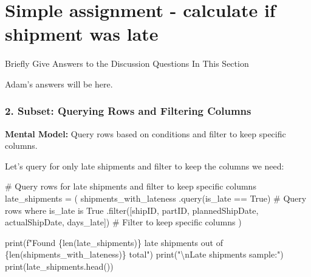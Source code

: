 \documentclass[
  letterpaper,
  DIV=11,
  numbers=noendperiod]{scrartcl}
\makeatletter
\let\oldparagraph\paragraph
\renewcommand{\paragraph}{
    \@ifstar
      \xxxParagraphStar
      \xxxParagraphNoStar
  }
\newcommand{\xxxParagraphStar}[1]{\oldparagraph*{#1}\mbox{}}
\newcommand{\xxxParagraphNoStar}[1]{\oldparagraph{#1}\mbox{}}
\newenvironment{Shaded}{\begin{snugshade}}{\end{snugshade}}
\newcommand{\BuiltInTok}[1]{\textcolor[rgb]{0.00,0.23,0.31}{#1}}
\newcommand{\CharTok}[1]{\textcolor[rgb]{0.13,0.47,0.30}{#1}}
\newcommand{\CommentTok}[1]{\textcolor[rgb]{0.37,0.37,0.37}{#1}}
\newcommand{\NormalTok}[1]{\textcolor[rgb]{0.00,0.23,0.31}{#1}}
\newcommand{\OperatorTok}[1]{\textcolor[rgb]{0.37,0.37,0.37}{#1}}
\newcommand{\SpecialCharTok}[1]{\textcolor[rgb]{0.37,0.37,0.37}{#1}}
\newcommand{\SpecialStringTok}[1]{\textcolor[rgb]{0.13,0.47,0.30}{#1}}
\newcommand{\StringTok}[1]{\textcolor[rgb]{0.13,0.47,0.30}{#1}}
\makeatother
\begin{document}
\section{Simple assignment - calculate if shipment was
late}\label{simple-assignment---calculate-if-shipment-was-late}

\paragraph{Briefly Give Answers to the Discussion Questions In This
Section}\label{briefly-give-answers-to-the-discussion-questions-in-this-section}

Adam's answers will be here.

\subsubsection{2. Subset: Querying Rows and Filtering
Columns}\label{subset-querying-rows-and-filtering-columns}

\textbf{Mental Model:} Query rows based on conditions and filter to keep
specific columns.

Let's query for only late shipments and filter to keep the columns we
need:

\label{mental-model-2-subset}
\begin{Shaded}
\begin{Highlighting}[]
\CommentTok{\# Query rows for late shipments and filter to keep specific columns}
\NormalTok{late\_shipments }\OperatorTok{=}\NormalTok{ (}
\NormalTok{    shipments\_with\_lateness}
\NormalTok{    .query(}\StringTok{\textquotesingle{}is\_late == True\textquotesingle{}}\NormalTok{)  }\CommentTok{\# Query rows where is\_late is True}
\NormalTok{    .}\BuiltInTok{filter}\NormalTok{([}\StringTok{\textquotesingle{}shipID\textquotesingle{}}\NormalTok{, }\StringTok{\textquotesingle{}partID\textquotesingle{}}\NormalTok{, }\StringTok{\textquotesingle{}plannedShipDate\textquotesingle{}}\NormalTok{, }\StringTok{\textquotesingle{}actualShipDate\textquotesingle{}}\NormalTok{, }\StringTok{\textquotesingle{}days\_late\textquotesingle{}}\NormalTok{])  }\CommentTok{\# Filter to keep specific columns}
\NormalTok{)}

\BuiltInTok{print}\NormalTok{(}\SpecialStringTok{f"Found }\SpecialCharTok{\{}\BuiltInTok{len}\NormalTok{(late\_shipments)}\SpecialCharTok{\}}\SpecialStringTok{ late shipments out of }\SpecialCharTok{\{}\BuiltInTok{len}\NormalTok{(shipments\_with\_lateness)}\SpecialCharTok{\}}\SpecialStringTok{ total"}\NormalTok{)}
\BuiltInTok{print}\NormalTok{(}\StringTok{"}\CharTok{\textbackslash{}n}\StringTok{Late shipments sample:"}\NormalTok{)}
\BuiltInTok{print}\NormalTok{(late\_shipments.head())}
\end{Highlighting}
\end{Shaded}
\end{document}
